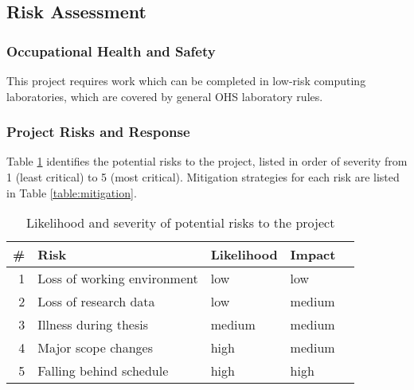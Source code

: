 \documentclass[pdftex,12pt,a4paper]{article}
\begin{document}
\subsection{Risk Assessment}
\subsubsection{Occupational Health and Safety}
This project requires work which can be completed in low-risk computing laboratories, which are covered by general OHS laboratory rules.

\subsubsection{Project Risks and Response}
Table \ref{table:risks} identifies the potential risks to the project, listed in order of severity from 1 (least critical) to 5 (most critical). Mitigation strategies for each risk are listed in Table \ref{table:mitigation}.

\hspace{0.5cm}
\begin{table}[H]
	\begin{center}
		\begin{tabular}{@{}rlllr@{}}
			\toprule
			\# & Risk & Likelihood & Impact \\
			\midrule
			1 & Loss of working environment & low & low \\
			2 & Loss of research data & low & medium \\
			3 & Illness during thesis & medium & medium \\
			4 & Major scope changes & high & medium \\
			5 & Falling behind schedule & high & high \\
			\bottomrule
		\end{tabular}
		\caption{Likelihood and severity of potential risks to the project}
		\label{table:risks}
	\end{center}
\end{table}
\end{document}
